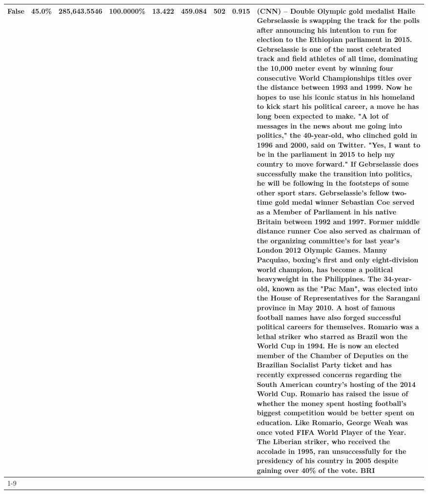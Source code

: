 \begin{table}[H]
{\begin{tabular}{lllrlllll}
False & 45.0\% & 285,643.5546 & \bfseries \color{red} 100.0000\% & 13.422 & 459.084 & 502 & 0.915 & (CNN) -- Double Olympic gold medalist Haile Gebrselassie is swapping the track for the polls after announcing his intention to run for election to the Ethiopian parliament in 2015. Gebrselassie is one of the most celebrated track and field athletes of all time, dominating the 10,000 meter event by winning four consecutive World Championships titles over the distance between 1993 and 1999. Now he hopes to use his iconic status in his homeland to kick start his political career, a move he has long been expected to make. "A lot of messages in the news about me going into politics," the 40-year-old, who clinched gold in 1996 and 2000, said on Twitter. "Yes, I want to be in the parliament in 2015 to help my country to move forward." If Gebrselassie does successfully make the transition into politics, he will be following in the footsteps of some other sport stars. Gebrselassie's fellow two-time gold medal winner Sebastian Coe served as a Member of Parliament in his native Britain between 1992 and 1997. Former middle distance runner Coe also served as chairman of the organizing committee's for last year's London 2012 Olympic Games. Manny Pacquiao, boxing's first and only eight-division world champion, has become a political heavyweight in the Philippines. The 34-year-old, known as the "Pac Man", was elected into the House of Representatives for the Sarangani province in May 2010. A host of famous football names have also forged successful political careers for themselves. Romario was a lethal striker who starred as Brazil won the World Cup in 1994. He is now an elected member of the Chamber of Deputies on the Brazilian Socialist Party ticket and has recently expressed concerns regarding the South American country's hosting of the 2014 World Cup. Romario has raised the issue of whether the money spent hosting football's biggest competition would be better spent on education. Like Romario, George Weah was once voted FIFA World Player of the Year. The Liberian striker, who received the accolade in 1995, ran unsuccessfully for the presidency of his country in 2005 despite gaining over 40\% of the vote. BRI \\
\cline{1-9}

\end{tabular}}
\end{table}
